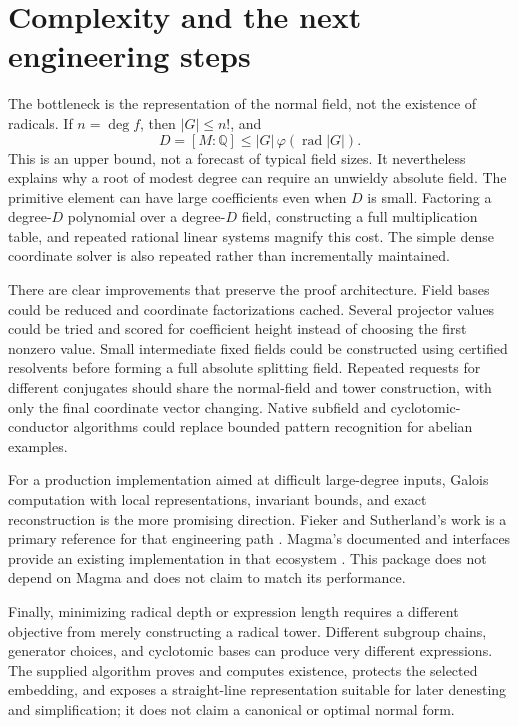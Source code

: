 \documentclass[11pt,letterpaper]{article}
\theoremstyle{definition}\newtheorem{definition}[theorem]{Definition}
\theoremstyle{remark}\newtheorem{remark}[theorem]{Remark}
\newcommand{\Q}{\mathbb Q}\newcommand{\C}{\mathbb C}\newcommand{\Z}{\mathbb Z}
\newcommand{\rad}{\operatorname{rad}}\newcommand{\code}[1]{\texttt{\detokenize{#1}}}
\begin{document}
\section{Complexity and the next engineering steps}
\label{sec:complexity}
The bottleneck is the representation of the normal field, not the existence
of radicals. If \(n=\deg f\), then \(|G|\le n!\), and
\[
 D=[M:\Q]\le |G|\,\varphi(\rad |G|).
\]
This is an upper bound, not a forecast of typical field sizes. It nevertheless
explains why a root of modest degree can require an unwieldy absolute field.
The primitive element can have large coefficients even when \(D\) is small.
Factoring a degree-\(D\) polynomial over a degree-\(D\) field, constructing a
full multiplication table, and repeated rational linear systems magnify
this cost. The simple dense coordinate solver is also repeated rather than
incrementally maintained.

There are clear improvements that preserve the proof architecture. Field
bases could be reduced and coordinate factorizations cached. Several
projector values could be tried and scored for coefficient height instead of
choosing the first nonzero value. Small intermediate fixed fields could be
constructed using certified resolvents before forming a full absolute
splitting field. Repeated requests for different conjugates should share the
normal-field and tower construction, with only the final coordinate vector
changing. Native subfield and cyclotomic-conductor algorithms could replace
bounded pattern recognition for abelian examples.

For a production implementation aimed at difficult large-degree inputs,
Galois computation with local representations, invariant bounds, and exact
reconstruction is the more promising direction. Fieker and Sutherland's work
is a primary reference for that engineering path \cite{fiekersutherland}.
Magma's documented \code{SolveByRadicals} and \code{CyclicToRadical}
interfaces provide an existing implementation in that ecosystem
\cite{magma}. This package does not depend on Magma and does not claim to
match its performance.

Finally, minimizing radical depth or expression length requires a different
objective from merely constructing a radical tower. Different subgroup
chains, generator choices, and cyclotomic bases can produce very different
expressions. The supplied algorithm proves and computes existence, protects
the selected embedding, and exposes a straight-line representation suitable
for later denesting and simplification; it does not claim a canonical or
optimal normal form.
\end{document}
